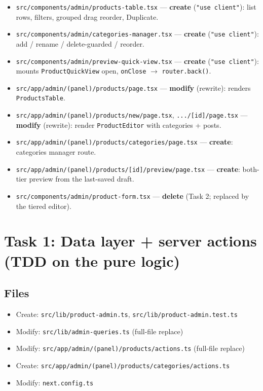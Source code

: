 \documentclass[11pt,a4paper]{article}
\begin{document}
\begin{itemize}
        tiered editor. \texttt{src/components/admin/product-editor.test.tsx} --- \textbf{create}.
  \item \texttt{src/components/admin/products-table.tsx} --- \textbf{create} (\texttt{"use client"}):
        list rows, filters, grouped drag reorder, Duplicate.
  \item \texttt{src/components/admin/categories-manager.tsx} --- \textbf{create} (\texttt{"use client"}):
        add / rename / delete-guarded / reorder.
  \item \texttt{src/components/admin/preview-quick-view.tsx} --- \textbf{create} (\texttt{"use client"}):
        mounts \texttt{ProductQuickView} open, \texttt{onClose} $\rightarrow$ \texttt{router.back()}.
  \item \texttt{src/app/admin/(panel)/products/page.tsx} --- \textbf{modify} (rewrite): renders
        \texttt{ProductsTable}.
  \item \texttt{src/app/admin/(panel)/products/new/page.tsx}, \texttt{.../[id]/page.tsx} ---
        \textbf{modify} (rewrite): render \texttt{ProductEditor} with categories + posts.
  \item \texttt{src/app/admin/(panel)/products/categories/page.tsx} --- \textbf{create}: categories
        manager route.
  \item \texttt{src/app/admin/(panel)/products/[id]/preview/page.tsx} --- \textbf{create}: both-tier
        preview from the last-saved draft.
  \item \texttt{src/components/admin/product-form.tsx} --- \textbf{delete} (Task 2; replaced by the
        tiered editor).
\end{itemize}

\section{Task 1: Data layer + server actions (TDD on the pure logic)}

\subsection*{Files}
\begin{itemize}
  \item Create: \texttt{src/lib/product-admin.ts}, \texttt{src/lib/product-admin.test.ts}
  \item Modify: \texttt{src/lib/admin-queries.ts} (full-file replace)
  \item Modify: \texttt{src/app/admin/(panel)/products/actions.ts} (full-file replace)
  \item Create: \texttt{src/app/admin/(panel)/products/categories/actions.ts}
  \item Modify: \texttt{next.config.ts}
\end{itemize}
\end{document}
